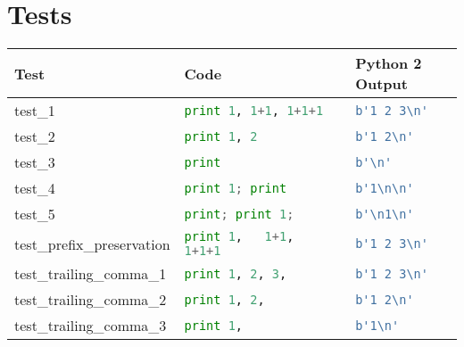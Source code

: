 \section{Tests}
\begin{table}[]
    \begin{tabular}{@{}l|ll@{}}
    \toprule
    Test                                  & Code                                                  & Python 2 Output                        \\ \midrule
    test\_1                               & \lstinline[language=Python, style=pythonstyle]|print 1, 1+1, 1+1+1                                  | & \lstinline[language=Python, style=pythonstyle]|b'1 2 3\n'             | \\
    test\_2                               & \lstinline[language=Python, style=pythonstyle]|print 1, 2                                           | & \lstinline[language=Python, style=pythonstyle]|b'1 2\n'               | \\
    test\_3                               & \lstinline[language=Python, style=pythonstyle]|print                                                | & \lstinline[language=Python, style=pythonstyle]|b'\n'                  | \\
    test\_4                               & \lstinline[language=Python, style=pythonstyle]|print 1; print                                       | & \lstinline[language=Python, style=pythonstyle]|b'1\n\n'| \\
    test\_5                               & \lstinline[language=Python, style=pythonstyle]|print; print 1;                                      | & \lstinline[language=Python, style=pythonstyle]|b'\n1\n'| \\
    test\_prefix\_preservation            & \lstinline[language=Python, style=pythonstyle]|print 1,   1+1,   1+1+1                              | & \lstinline[language=Python, style=pythonstyle]|b'1 2 3\n'             | \\
    test\_trailing\_comma\_1              & \lstinline[language=Python, style=pythonstyle]|print 1, 2, 3,                                       | & \lstinline[language=Python, style=pythonstyle]|b'1 2 3\n'             | \\
    test\_trailing\_comma\_2              & \lstinline[language=Python, style=pythonstyle]|print 1, 2,                                          | & \lstinline[language=Python, style=pythonstyle]|b'1 2\n'               | \\
    test\_trailing\_comma\_3              & \lstinline[language=Python, style=pythonstyle]|print 1,                                             | & \lstinline[language=Python, style=pythonstyle]|b'1\n'                 | \\

\end{tabular}
\end{table}
